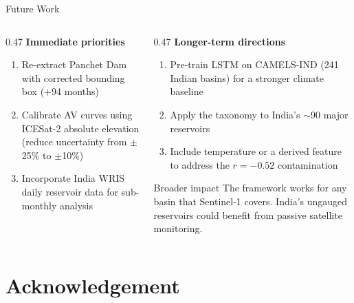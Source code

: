 \documentclass[10pt]{beamer}
\begin{document}
\begin{frame}{Future Work}
  \begin{columns}[T]
    \begin{column}{0.47\textwidth}
      \small\textbf{Immediate priorities}
      \begin{enumerate}\footnotesize
        \item Re-extract Panchet Dam with corrected
              bounding box ($+$94 months)
        \item Calibrate AV curves using ICESat-2
              absolute elevation (reduce uncertainty
              from $\pm$25\% to $\pm$10\%)
        \item Incorporate India WRIS daily reservoir
              data for sub-monthly analysis
      \end{enumerate}
    \end{column}
    \begin{column}{0.47\textwidth}
      \small\textbf{Longer-term directions}
      \begin{enumerate}\footnotesize
        \setcounter{enumi}{3}
        \item Pre-train LSTM on CAMELS-IND
              (241 Indian basins) for a stronger
              climate baseline
        \item Apply the taxonomy to India's
              $\sim$90 major reservoirs
        \item Include temperature or a derived
              feature to address the $r = -0.52$
              contamination
      \end{enumerate}

      \vspace{6pt}
      \begin{exampleblock}{\small Broader impact}
        \footnotesize
        The framework works for any basin that
        Sentinel-1 covers. India's ungauged reservoirs
        could benefit from passive satellite monitoring.
      \end{exampleblock}
    \end{column}
  \end{columns}
\end{frame}


\section*{Acknowledgement}
\end{document}
